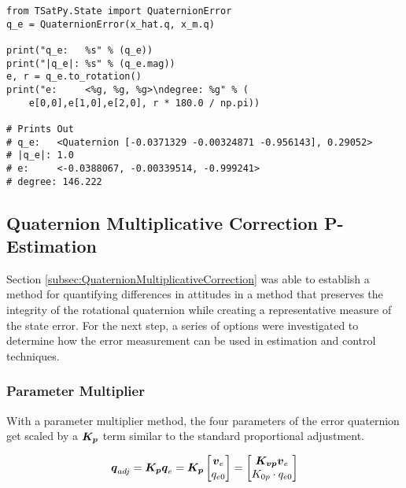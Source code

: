 \begin{singlespace}
  \begin{verbatim}
from TSatPy.State import QuaternionError
q_e = QuaternionError(x_hat.q, x_m.q)

print("q_e:   %s" % (q_e))
print("|q_e|: %s" % (q_e.mag))
e, r = q_e.to_rotation()
print("e:     <%g, %g, %g>\ndegree: %g" % (
    e[0,0],e[1,0],e[2,0], r * 180.0 / np.pi))

# Prints Out
# q_e:   <Quaternion [-0.0371329 -0.00324871 -0.956143], 0.29052>
# |q_e|: 1.0
# e:     <-0.0388067, -0.00339514, -0.999241>
# degree: 146.222
  \end{verbatim}
\nocite{minted}
\end{singlespace}

\subsection{Quaternion Multiplicative Correction P-Estimation}
\label{subsec:QuaternionMultiplicativeCorrectionPEstimation}

Section \ref{subsec:QuaternionMultiplicativeCorrection} was able to establish a method for quantifying differences in attitudes in a method that preserves the integrity of the rotational quaternion while creating a representative measure of the state error.  For the next step, a series of options were investigated to determine how the error measurement can be used in estimation and control techniques.

\subsubsection{Parameter Multiplier}
\label{subsubsec:ParameterMultiplier}

With a parameter multiplier method, the four parameters of the error quaternion get scaled by a $\boldsymbol{K_p}$ term similar to the standard proportional adjustment.

\begin{equation}
  \boldsymbol{q}_{adj} = \boldsymbol{K_p} \boldsymbol{q}_e
    = \boldsymbol{K_p} \begin{bmatrix} \boldsymbol{v}_e \\ q_{e0} \end{bmatrix}
    = \begin{bmatrix} \boldsymbol{K_{vp}}\boldsymbol{v}_e \\ K_{0p} \cdot q_{e0} \end{bmatrix}
  \label{eqn:ParameterMultiplier}
\end{equation}

